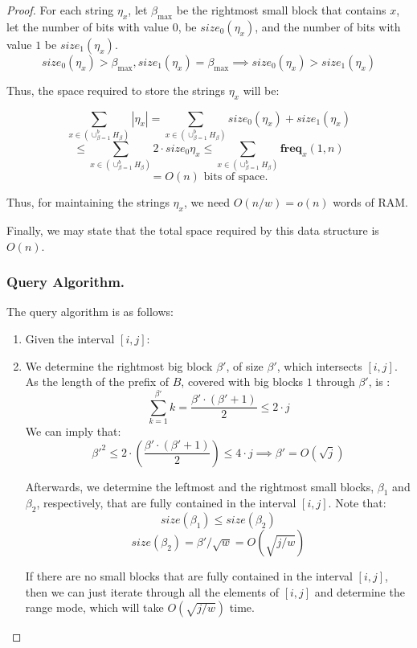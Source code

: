 \documentclass[runningheads]{llncs}
\begin{document}
\begin{proof}
    For each string $\eta_x$, let $\beta_{\text{max}}$ be the rightmost small block that contains $x$, let the number of bits with value $0$, be $size_0(\eta_x)$, and the number of bits with value $1$ be $size_1(\eta_x)$.
    \[
        size_0(\eta_x)>\beta_{\text{max}} , size_1(\eta_x)=\beta_{\text{max}} \implies size_0(\eta_x)>size_1(\eta_x)
    \]

    Thus, the space required to store the strings $\eta_x$ will be:

    \[
        \sum_{x \in ( \cup_{\beta=1}^{b}H_{\beta} ) } |\eta_x| = \sum_{x \in ( \cup_{\beta=1}^{b}H_{\beta} ) } size_0(\eta_x)+size_1(\eta_x)  
    \]
    \[
        \leq  \sum_{x \in ( \cup_{\beta=1}^{b}H_{\beta} ) } 2\cdot size_0{\eta_x} \leq  \sum_{x \in ( \cup_{\beta=1}^{b}H_{\beta} ) } \textbf{freq}_x(1,n)
    \]
    \[
        =O(n) \text{ bits of space.}
    \]

    Thus, for maintaining the strings $\eta_x$, we need $O(n/w)=o(n)$ words of RAM.

    Finally, we may state that the total space required by this data structure is $O(n)$.

    \subsubsection{Query Algorithm.} The  query algorithm is as follows:
    \begin{enumerate}
        \item[] Given the interval $[i,j]$: 
        
        \item We determine the rightmost big block $\beta'$, of size $\beta'$, which intersects $[i,j]$. As the length of the prefix of $B$, covered with big blocks $1$ through $\beta'$, is :
            \[
             \sum_{k=1}^{\beta'}k=\frac{\beta'\cdot(\beta'+1)}{2} \leq 2 \cdot j 
            \] 
            We can imply that:
            \[
                \beta'^2 \leq 2\cdot ( \frac{\beta'\cdot(\beta'+1)}{2} ) \leq 4\cdot j \implies \beta' = O(\sqrt{j}) 
            \]

        Afterwards, we determine the leftmost and the rightmost small blocks, $\beta_1$ and $\beta_2$, respectively, that are fully contained in the interval $[i,j]$. Note that:
        \[
            size(\beta_1)\leq size(\beta_2)
        \]
        \[
            size(\beta_2) = \beta'/\sqrt{w} = O(\sqrt{j/w})
        \]
        
        If there are no small blocks that are fully contained in the interval $[i,j]$, then we can just iterate through  all the elements of $[i,j]$ and determine the range mode, 
        which will take $O(\sqrt{j/w})$ time.


\end{enumerate}
\end{proof}
\end{document}

